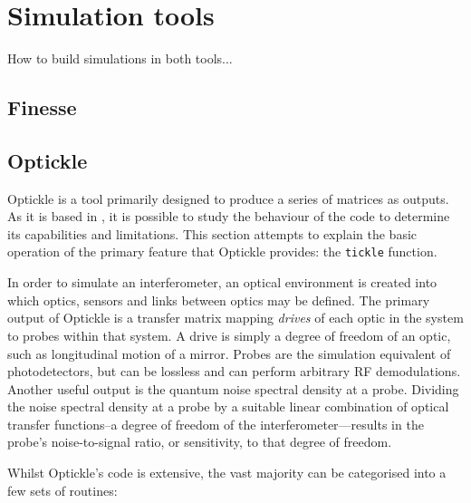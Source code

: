 \chapter{\label{a:simulation-tools}Simulation tools}
How to build simulations in both tools...




\section{\label{sec:finesse-sim}Finesse}

\section{\label{sec:optickle-sim}Optickle}
Optickle is a tool primarily designed to produce a series of matrices as outputs. As it is based in \MATLAB, it is possible to study the behaviour of the code to determine its capabilities and limitations. This section attempts to explain the basic operation of the primary feature that Optickle provides: the \lstinline!tickle! function.

In order to simulate an interferometer, an optical environment is created into which optics, sensors and links between optics may be defined. The primary output of Optickle is a transfer matrix mapping \emph{drives} of each optic in the system to probes within that system. A drive is simply a degree of freedom of an optic, such as longitudinal motion of a mirror. Probes are the simulation equivalent of photodetectors, but can be lossless and can perform arbitrary RF demodulations. Another useful output is the quantum noise spectral density at a probe. Dividing the noise spectral density at a probe by a suitable linear combination of optical transfer functions--a degree of freedom of the interferometer---results in the probe's noise-to-signal ratio, or sensitivity, to that degree of freedom.

Whilst Optickle's code is extensive, the vast majority can be categorised into a few sets of routines:

